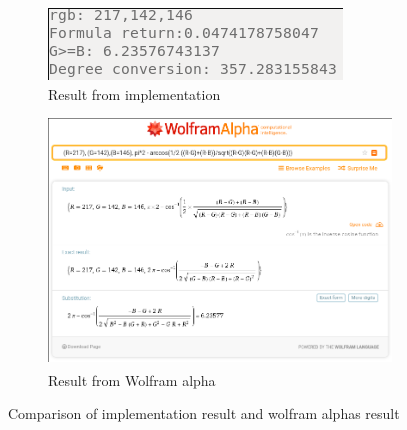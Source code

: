 \documentclass{article}
\newcommand{\goodcite}[1]{\textsuperscript{\cite{#1}}}
\begin{document}
\begin{figure}[H]
\centering
\begin{subfigure}{.5\textwidth}
  \centering
  \includegraphics[width=0.9\linewidth]{img/rgb-217-142-146-code.png}
    \caption{Result from implementation}
  \label{fig:217_code}
\end{subfigure}%
\begin{subfigure}{.5\textwidth}
  \centering
  \includegraphics[width=0.9\linewidth]{img/rgb-217-142-146-wolfram.png}
    \caption{Result from Wolfram alpha\goodcite{Wolfram}}
  \label{fig:217_wolfram}
\end{subfigure}
\caption{Comparison of implementation result and wolfram alphas result}
\label{fig:Comparison-217}
\end{figure}
\end{document}
